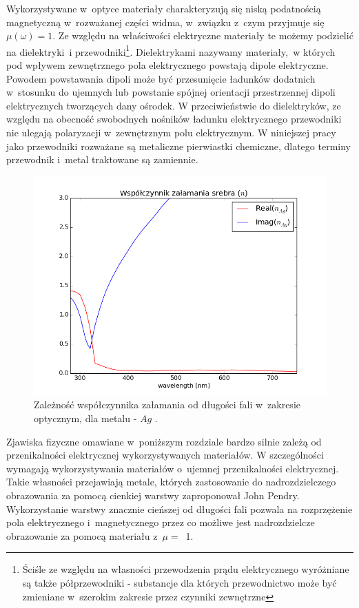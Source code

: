 Wykorzystywane w~optyce materiały charakteryzują się niską podatnością magnetyczną w~rozważanej części widma, w~związku z~czym przyjmuje się $\mu(\omega)=1$. Ze względu na właściwości elektryczne  materiały te możemy  podzielić na dielektryki~i przewodniki\footnote{Ściśle ze względu na własności przewodzenia prądu elektrycznego wyróżniane są także półprzewodniki - substancje dla których przewodnictwo może być zmieniane w~szerokim zakresie przez czynniki zewnętrzne}. Dielektrykami nazywamy materiały,~w których pod wpływem zewnętrznego pola elektrycznego powstają dipole elektryczne. Powodem powstawania dipoli może być przesunięcie ładunków dodatnich w~stosunku do ujemnych lub powstanie spójnej orientacji przestrzennej dipoli elektrycznych tworzących dany ośrodek. W przeciwieństwie do dielektryków, ze względu na obecność swobodnych nośników ładunku elektrycznego przewodniki nie ulegają polaryzacji w~zewnętrznym polu elektrycznym. W niniejszej pracy jako przewodniki rozważane są metaliczne pierwiastki chemiczne, dlatego terminy przewodnik i~metal traktowane są zamiennie.

\begin{figure}[tb]
	\includegraphics[width=\textwidth]{images/agn.png}
	\caption{Zależność współczynnika załamania od długości fali w~zakresie optycznym, dla metalu - $Ag$ \cite{PhysRevB.6.4370}.  }
	\label{fig:agn}
\end{figure}
Zjawiska fizyczne omawiane w~poniższym rozdziale bardzo silnie zależą od przenikalności elektrycznej wykorzystywanych materiałów. W szczególności wymagają wykorzystywania materiałów o~ujemnej przenikalności elektrycznej. Takie własności przejawiają metale, których zastosowanie do nadrozdzielczego obrazowania za pomocą cienkiej warstwy zaproponował John Pendry. Wykorzystanie warstwy znacznie cieńszej od długości fali pozwala na rozprzężenie pola elektrycznego i~magnetycznego przez co możliwe jest nadrozdzielcze obrazowanie za pomocą materiału z~$\mu=$~1\cite{PhysRevLett.85.3966}.

